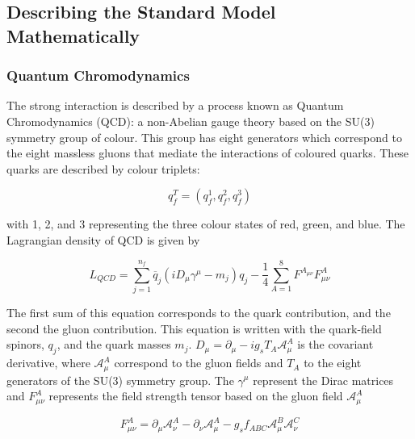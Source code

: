 \documentclass[12pt,a4paper,epsf,portrait,times,epsfig]{article}
\begin{document}
		\subsection{Describing the Standard Model Mathematically}
		
		\subsubsection{Quantum Chromodynamics}
		
		The strong interaction is described by a process known as Quantum Chromodynamics (QCD)\cite{Article:PDG}\cite{Article:QCDPrimer}: a non-Abelian gauge theory based on the SU(3) symmetry group of colour. This group has eight generators which correspond to the eight massless gluons that mediate the interactions of coloured quarks. These quarks are described by colour triplets:
		
		\begin{center}
			\begin{equation}
				q_{f}^{T} = (q_{f}^{1},q_{f}^{2},q_{f}^{3})
			\end{equation}
		\end{center}
	
		with 1, 2, and 3 representing the three colour states of red, green, and blue. 
		The Lagrangian density of QCD is given by
		
		\begin{center}
			\begin{equation}
				L_{QCD}=\sum_{j=1}^{n_{f}}\overline{q}_{j}(iD_{\mu}\gamma^{\mu}-m_{j})q_{j}-\frac{1}{4}\sum_{A=1}^{8}F^{A_{\mu\nu}}F_{\mu\nu}^{A}
			\end{equation}
		\end{center}
		
		The first sum of this equation corresponds to the quark contribution, and the second the gluon contribution. This equation is written with the quark-field spinors, $q_{j}$, and the quark masses $m_{j}$. $D_{\mu} = \partial_{\mu}-ig_{s}T_{A}\mathcal{A}_{\mu}^{A}$ is the covariant derivative, where $\mathcal{A}_{\mu}^{A}$ correspond to the gluon fields and $T_{A}$ to the eight generators of the SU(3) symmetry group. The $\gamma^{\mu}$ represent the Dirac matrices and $F_{\mu\nu}^{A}$ represents the field strength tensor based on the gluon field $\mathcal{A}_{\mu}^{A}$
		
		\begin{center}
			\begin{equation}
				F_{\mu\nu}^{A} = \partial_{\mu}\mathcal{A}_{\nu}^{A}-\partial_{\nu}\mathcal{A}_{\mu}^{A}-g_{s}f_{ABC}\mathcal{A}_{\mu}^{B}\mathcal{A}_{\nu}^{C}
			\end{equation}
		\end{center}
		
\end{document}
